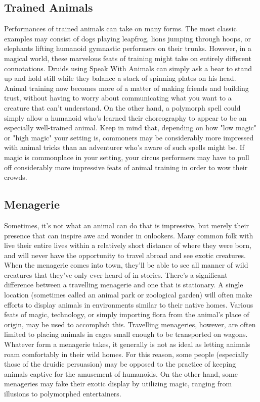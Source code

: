 \documentclass[10pt,a4paper,twoside,bg=print,twocolumn,openany,nodeprecatedcode]{dndbook}
\begin{document}
\subsection{Trained Animals}
Performances of trained animals can take on many forms. The most classic examples may consist of dogs playing leapfrog, lions jumping through hoops, or elephants lifting humanoid gymnastic performers on their trunks. However, in a magical world, these marvelous feats of training might take on entirely different connotations. Druids using Speak With Animals can simply ask a bear to stand up and hold still while they balance a stack of spinning plates on his head. Animal training now becomes more of a matter of making friends and building trust, without having to worry about communicating what you want to a creature that can't understand.
On the other hand, a polymorph spell could simply allow a humanoid who's learned their choreography to appear to be an especially well-trained animal. Keep in mind that, depending on how "low magic" or "high magic" your setting is, commoners may be considerably more impressed with animal tricks than an adventurer who's aware of such spells might be. If magic is commonplace in your setting, your circus performers may have to pull off considerably more impressive feats of animal training in order to wow their crowds.
\subsection{Menagerie}
Sometimes, it's not what an animal can do that is impressive, but merely their presence that can inspire awe and wonder in onlookers. Many common folk with live their entire lives within a relatively short distance of where they were born, and will never have the opportunity to travel abroad and see exotic creatures. When the menagerie comes into town, they'll be able to see all manner of wild creatures that they've only ever heard of in stories.
There's a significant difference between a travelling menagerie and one that is stationary. A single location (sometimes called an animal park or zoological garden) will often make efforts to display animals in environments similar to their native homes. Various feats of magic, technology, or simply importing flora from the animal's place of origin, may be used to accomplish this. Travelling menageries, however, are often limited to placing animals in cages small enough to be transported on wagons.
Whatever form a menagerie takes, it generally is not as ideal as letting animals roam comfortably in their wild homes. For this reason, some people (especially those of the druidic persuasion) may be opposed to the practice of keeping animals captive for the amusement of humanoids. On the other hand, some menageries may fake their exotic display by utilizing magic, ranging from illusions to polymorphed entertainers.
\end{document}
